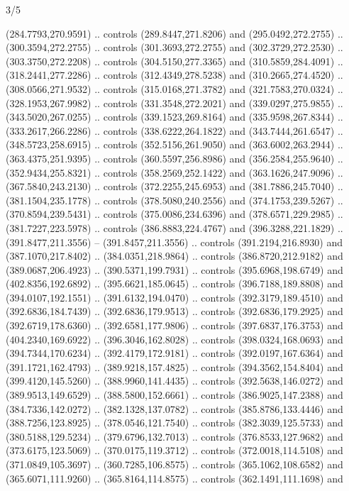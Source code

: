 \begin{flagdescription}{3/5}
\begin{scope}[shift={(0.5\flaglength,0.5\flagwidth)},scale=\flagwidth/510]
\begin{scope}[y=0.80pt, x=0.80pt, yscale=-1.06, xscale=1.06,yshift=-240pt,xshift=-400pt]
\begin{scope}[cm={{0.83333,0.0,0.0,0.83333,(154.64672,48.64761)}}]
  (284.7793,270.9591) .. controls (289.8447,271.8206) and (295.0492,272.2755) ..
  (300.3594,272.2755) .. controls (301.3693,272.2755) and (302.3729,272.2530) ..
  (303.3750,272.2208) .. controls (304.5150,277.3365) and (310.5859,284.4091) ..
  (318.2441,277.2286) .. controls (312.4349,278.5238) and (310.2665,274.4520) ..
  (308.0566,271.9532) .. controls (315.0168,271.3782) and (321.7583,270.0324) ..
  (328.1953,267.9982) .. controls (331.3548,272.2021) and (339.0297,275.9855) ..
  (343.5020,267.0255) .. controls (339.1523,269.8164) and (335.9598,267.8344) ..
  (333.2617,266.2286) .. controls (338.6222,264.1822) and (343.7444,261.6547) ..
  (348.5723,258.6915) .. controls (352.5156,261.9050) and (363.6002,263.2944) ..
  (363.4375,251.9395) .. controls (360.5597,256.8986) and (356.2584,255.9640) ..
  (352.9434,255.8321) .. controls (358.2569,252.1422) and (363.1626,247.9096) ..
  (367.5840,243.2130) .. controls (372.2255,245.6953) and (381.7886,245.7040) ..
  (381.1504,235.1778) .. controls (378.5080,240.2556) and (374.1753,239.5267) ..
  (370.8594,239.5431) .. controls (375.0086,234.6396) and (378.6571,229.2985) ..
  (381.7227,223.5978) .. controls (386.8883,224.4767) and (396.3288,221.1829) ..
  (391.8477,211.3556) -- (391.8457,211.3556) .. controls (391.2194,216.8930) and
  (387.1070,217.8402) .. (384.0351,218.9864) .. controls (386.8720,212.9182) and
  (389.0687,206.4923) .. (390.5371,199.7931) .. controls (395.6968,198.6749) and
  (402.8356,192.6892) .. (395.6621,185.0645) .. controls (396.7188,189.8808) and
  (394.0107,192.1551) .. (391.6132,194.0470) .. controls (392.3179,189.4510) and
  (392.6836,184.7439) .. (392.6836,179.9513) .. controls (392.6836,179.2925) and
  (392.6719,178.6360) .. (392.6581,177.9806) .. controls (397.6837,176.3753) and
  (404.2340,169.6922) .. (396.3046,162.8028) .. controls (398.0324,168.0693) and
  (394.7344,170.6234) .. (392.4179,172.9181) .. controls (392.0197,167.6364) and
  (391.1721,162.4793) .. (389.9218,157.4825) .. controls (394.3562,154.8404) and
  (399.4120,145.5260) .. (388.9960,141.4435) .. controls (392.5638,146.0272) and
  (389.9513,149.6529) .. (388.5800,152.6661) .. controls (386.9025,147.2388) and
  (384.7336,142.0272) .. (382.1328,137.0782) .. controls (385.8786,133.4446) and
  (388.7256,123.8925) .. (378.0546,121.7540) .. controls (382.3039,125.5733) and
  (380.5188,129.5234) .. (379.6796,132.7013) .. controls (376.8533,127.9682) and
  (373.6175,123.5069) .. (370.0175,119.3712) .. controls (372.0018,114.5108) and
  (371.0849,105.3697) .. (360.7285,106.8575) .. controls (365.1062,108.6582) and
  (365.6071,111.9260) .. (365.8164,114.8575) .. controls (362.1491,111.1698) and

\end{scope}
\end{scope}
\end{scope}
\end{flagdescription}
